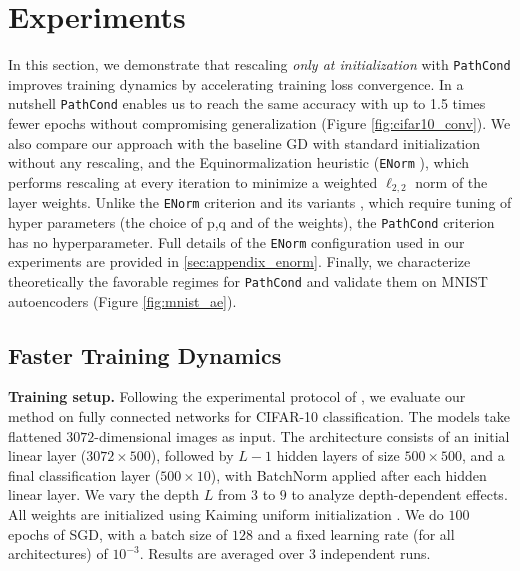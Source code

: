 \documentclass{article}
\theoremstyle{plain}
\theoremstyle{definition}
\theoremstyle{remark}
\def\pathcond{{\texttt{PathCond} }}
\def\enorm{{\texttt{ENorm} }}
\begin{document}
{\section{Experiments}
\label{sec:experiments}

In this section, we demonstrate that rescaling \emph{only at initialization} with \pathcond improves
training dynamics by accelerating training loss convergence.
In a nutshell \pathcond enables us to reach the same accuracy with 
up to 1.5 times fewer epochs
without compromising generalization (Figure \ref{fig:cifar10_conv}).
We also compare our approach with the baseline GD with standard initialization
without any rescaling, and the Equinormalization heuristic \citep{stock2019equinormalizationneuralnetworks}
(\enorm), which performs rescaling at every iteration to minimize a weighted
$\ell_{2,2}$ norm of the layer weights.
Unlike the \enorm criterion and its variants \citep{saul2023weightbalancing}, which require tuning of hyper parameters (the choice of p,q and of the weights), the \pathcond criterion has no hyperparameter.
Full details of the \enorm configuration used in our
experiments are provided in \cref{sec:appendix_enorm}.
Finally, we characterize theoretically the favorable regimes for \pathcond 
and validate them on MNIST autoencoders (Figure \ref{fig:mnist_ae}).



\subsection{Faster Training Dynamics}
\label{sec:faster}

\textbf{Training setup.}
Following the experimental protocol of \citet{stock2019equinormalizationneuralnetworks}, we evaluate our method 
on fully connected networks for CIFAR-10 classification.
The models take flattened $3072$-dimensional images as input. 
The architecture consists of an initial linear layer ($3072 \times 500$), 
followed by $L-1$ hidden layers of size $500 \times 500$, 
and a final classification layer ($500 \times 10$), with BatchNorm applied after each hidden linear layer.
We vary the depth $L$ from $3$ to $9$ to analyze depth-dependent effects.
All weights are initialized using Kaiming uniform initialization \citep{he2015delving}. 
We do $100$ epochs of SGD, with a batch size of $128$ 
and a fixed learning rate (for all architectures) of $10^{-3}$. 
Results are averaged over $3$ independent runs. 


}
\end{document}
